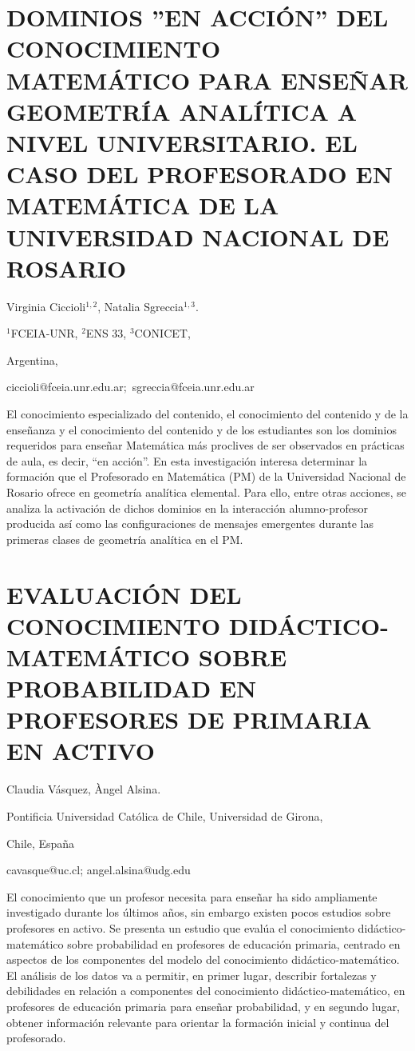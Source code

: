 \section{\uppercase{ dominios ''en acción'' del conocimiento matemático para
enseñar geometría analítica a nivel universitario. el caso del Profesorado
en Matemática de la Universidad nacional de rosario}}

\begin{datos}

Virginia Ciccioli$^{1,2}$, Natalia Sgreccia$^{1,3}$.

$^{1}$FCEIA-UNR, $^{2}$ENS 33, $^{3}$CONICET,

Argentina,

ciccioli@fceia.unr.edu.ar$;$ sgreccia@fceia.unr.edu.ar 

\end{datos}

El conocimiento especializado del contenido, el conocimiento del contenido
y de la enseñanza y el conocimiento del contenido y de los estudiantes
son los dominios requeridos para enseñar Matemática más proclives
de ser observados en prácticas de aula, es decir, “en acción”. En
esta investigación interesa determinar la formación que el Profesorado
en Matemática (PM) de la Universidad Nacional de Rosario ofrece en
geometría analítica elemental. Para ello, entre otras acciones, se
analiza la activación de dichos dominios en la interacción alumno-profesor
producida así como las configuraciones de mensajes emergentes durante
las primeras clases de geometría analítica en el PM.


\section{EVALUACIÓN DEL CONOCIMIENTO DIDÁCTICO-MATEMÁTICO SOBRE PROBABILIDAD
EN PROFESORES DE PRIMARIA EN ACTIVO}

\begin{datos}

Claudia Vásquez, Àngel Alsina.

Pontificia Universidad Católica de Chile, Universidad de Girona,

Chile, España

cavasque@uc.cl; angel.alsina@udg.edu

\end{datos}

El conocimiento que un profesor necesita para enseñar ha sido ampliamente
investigado durante los últimos años, sin embargo existen pocos estudios
sobre profesores en activo. Se presenta un estudio que evalúa el conocimiento
didáctico-matemático sobre probabilidad en profesores de educación
primaria, centrado en aspectos de los componentes del modelo del conocimiento
didáctico-matemático. El análisis de los datos va a permitir, en primer
lugar, describir fortalezas y debilidades en relación a componentes
del conocimiento didáctico-matemático, en profesores de educación
primaria para enseñar probabilidad, y en segundo lugar, obtener información
relevante para orientar la formación inicial y continua del profesorado. 


